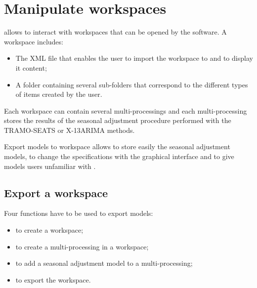 \documentclass[article]{jss}
\providecommand{\tightlist}{%
  \setlength{\itemsep}{0pt}\setlength{\parskip}{0pt}}
\begin{document}
\hypertarget{manipulate-workspace}{%
\section[Manipulate JDemetra+ workspaces]{Manipulate  workspaces}\label{manipulate-workspace}}

 allows to interact with  workspaces
that can be opened by the software. A workspace includes:

\begin{itemize}
\tightlist
\item
  The XML file that enables the user to import the workspace to
   and to display it content;\\
\item
  A folder containing several sub-folders that correspond to the
  different types of items created by the user.
\end{itemize}

Each workspace can contain several multi-processings and each
multi-processing stores the results of the seasonal adjustment procedure
performed with the TRAMO-SEATS or X-13ARIMA methods.

Export models to workspace allows to store easily the seasonal
adjustment models, to change the specifications with the
 graphical interface and to give models users
unfamiliar with .

\hypertarget{export-wk}{%
\subsection{Export a workspace}\label{export-wk}}

Four functions have to be used to export models:

\begin{itemize}
\tightlist
\item
   to create a workspace;\\
\item
   to create a multi-processing in a
  workspace;\\
\item
   to add a seasonal adjustment model to a
  multi-processing;\\
\item
   to export the workspace.
\end{itemize}
\end{document}
